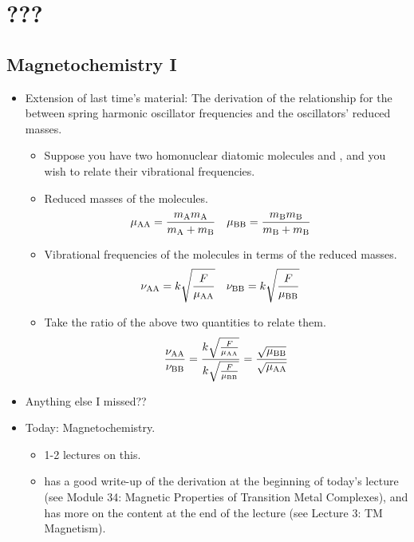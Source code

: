 \documentclass[../notes.tex]{subfiles}
\begin{document}
\chapter{???}
\section{Magnetochemistry I}
\begin{itemize}
    \item {}Extension of last time's material: The derivation of the relationship for the between spring harmonic oscillator frequencies and the oscillators' reduced masses.
    \begin{itemize}
        \item Suppose you have two homonuclear diatomic molecules  and , and you wish to relate their vibrational frequencies.
        \item Reduced masses of the molecules.
        \begin{align*}
            \mu_{\ce{AA}} &= \frac{m_{\ce{A}}m_{\ce{A}}}{m_{\ce{A}}+m_{\ce{B}}}&
            \mu_{\ce{BB}} &= \frac{m_{\ce{B}}m_{\ce{B}}}{m_{\ce{B}}+m_{\ce{B}}}
        \end{align*}
        \item Vibrational frequencies of the molecules in terms of the reduced masses.
        \begin{align*}
            \nu_{\ce{AA}} &= k\sqrt{\frac{F}{\mu_{\ce{AA}}}}&
            \nu_{\ce{BB}} &= k\sqrt{\frac{F}{\mu_{\ce{BB}}}}
        \end{align*}
        \item Take the ratio of the above two quantities to relate them.
        \begin{equation*}
            \frac{\nu_{\ce{AA}}}{\nu_{\ce{BB}}} = \frac{k\sqrt{\frac{F}{\mu_{\ce{AA}}}}}{k\sqrt{\frac{F}{\mu_{\ce{BB}}}}}
            = \frac{\sqrt{\mu_{\ce{BB}}}}{\sqrt{\mu_{\ce{AA}}}}
        \end{equation*}
    \end{itemize}
    \item Anything else I missed??
    \item Today: Magnetochemistry.
    \begin{itemize}
        \item 1-2 lectures on this.
        \item \textcite{bib:CHEM20100Notes} has a good write-up of the derivation at the beginning of today's lecture (see Module 34: Magnetic Properties of Transition Metal Complexes), and \textcite{bib:CHEM20200Notes} has more on the content at the end of the lecture (see Lecture 3: TM Magnetism).

\end{itemize}
\end{itemize}
\end{document}
